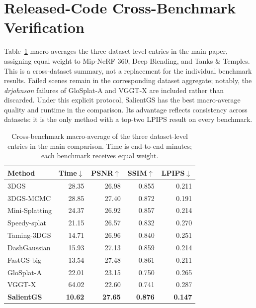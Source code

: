 \documentclass[sigconf]{acmart}
\begin{document}
\section{Released-Code Cross-Benchmark Verification}
\label{sec:supp_release_verification}

Table~\ref{tab:supp_cross_benchmark} macro-averages the three dataset-level entries in the main paper, assigning equal weight to Mip-NeRF 360, Deep Blending, and Tanks \& Temples. This is a cross-dataset summary, not a replacement for the individual benchmark results. Failed scenes remain in the corresponding dataset aggregate; notably, the \textit{drjohnson} failures of GloSplat-A and VGGT-X are included rather than discarded. Under this explicit protocol, SalientGS has the best macro-average quality and runtime in the comparison. Its advantage reflects consistency across datasets: it is the only method with a top-two LPIPS result on every benchmark.

\begin{table}[t]
    \centering
    \footnotesize
    \setlength\tabcolsep{4pt}
    \caption{Cross-benchmark macro-average of the three dataset-level entries in the main comparison. Time is end-to-end minutes; each benchmark receives equal weight.}
    \label{tab:supp_cross_benchmark}
    \begin{tabular}{lrrrr}
        \toprule
        Method & Time$\downarrow$ & PSNR$\uparrow$ & SSIM$\uparrow$ & LPIPS$\downarrow$ \\
        \midrule
        3DGS & 28.35 & 26.98 & 0.855 & 0.211 \\
        3DGS-MCMC & 28.85 & 27.40 & 0.872 & 0.191 \\
        Mini-Splatting & 24.37 & 26.92 & 0.857 & 0.214 \\
        Speedy-splat & 21.15 & 26.57 & 0.832 & 0.270 \\
        Taming-3DGS & 14.71 & 26.96 & 0.840 & 0.251 \\
        DashGaussian & 15.93 & 27.13 & 0.859 & 0.214 \\
        FastGS-big & 13.54 & 27.48 & 0.861 & 0.211 \\
        GloSplat-A & 22.01 & 23.15 & 0.750 & 0.265 \\
        VGGT-X & 64.02 & 22.60 & 0.741 & 0.287 \\
        \textbf{SalientGS} & \textbf{10.62} & \textbf{27.65} & \textbf{0.876} & \textbf{0.147} \\
        \bottomrule
    \end{tabular}
\end{table}
\end{document}
